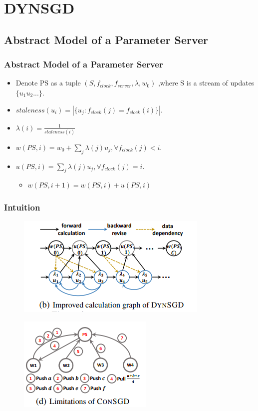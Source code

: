\section{DYNSGD}

\subsection{Abstract Model of a Parameter Server}
\begin{frame}
    \frametitle{Abstract Model of a Parameter Server}
	\begin{itemize}
		\item Denote PS as a tuple $(S, f_{clock}, f_{server}, \lambda, w_{0})$ ,where S is a stream of updates $\{u_{1}u_{2}...\}.$
		\item $staleness(u_{i})=|\{u_{j}:f_{clock}(j)=f_{clock}(i)\}|.$
		\item $\lambda(i)=\frac{1}{staleness(i)}$
		\item $w(PS, i)=w_{0}+\sum_{j}\lambda(j)u_{j},   \forall f_{clock}(j)<i.$
		\item $u(PS, i)= \sum_{j}\lambda(j)u_{j},   \forall f_{clock}(j)=i.$
			\begin{itemize}
				\item $w(PS,i+1) = w(PS, i) + u(PS, i)$
			\end{itemize}
	\end{itemize}
\end{frame}
\begin{frame}
	\frametitle{Intuition}
	\begin{figure}
		\includegraphics[scale=0.8]{figure/intuitiondynsgd.png}
	\end{figure}
\end{frame}
\begin{frame}
	\begin{figure}
		\includegraphics[scale=0.8]{figure/consgdlimit.png}
	\end{figure}
\end{frame}




